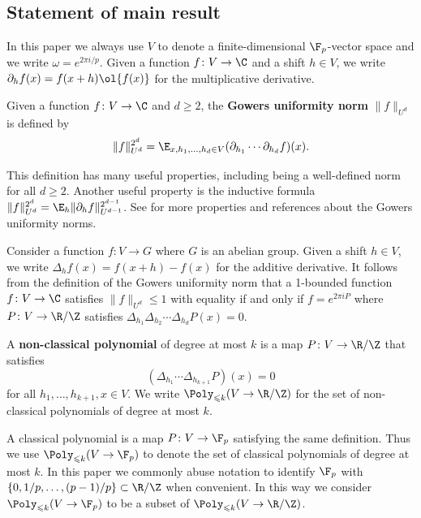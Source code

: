 \subsection{Statement of main result}

In this paper we always use $V$ to denote a finite-dimensional $\F_p$-vector space and we write $\omega=e^{2\pi i/p}$. Given a function $f\colon V\to\C$ and a shift $h\in V$, we write $\partial_h f(x)=f(x+h)\ol{f(x)}$ for the multiplicative derivative.

\begin{defn}
Given a function $f\colon V\to\C$ and $d\geq 2$, the {\textbf{Gowers uniformity norm}} $\|f\|_{U^d}$ is defined by \[\|f\|_{U^d}^{2^d}=\E_{x,h_1,\ldots,h_d\in V}(\partial_{h_1}\cdots\partial_{h_d}f)(x).\]
\end{defn}

This definition has many useful properties, including being a well-defined norm for all $d\geq 2$. Another useful property is the inductive formula $\|f\|_{U^d}^{2^d}=\E_h \|\partial_h f\|_{U^{d-1}}^{2^{d-1}}$.
See \cite[Lemma B.1]{TZ12} for more properties and references about the Gowers uniformity norms.

Consider a function $f\colon V\to G$ where $G$ is an abelian group. Given a shift $h\in V$, we write $\Delta_hf(x)=f(x+h)-f(x)$ for the additive derivative. It follows from the definition of the Gowers uniformity norm that a 1-bounded function $f\colon V\to\C$ satisfies $\|f\|_{U^d}\leq 1$ with equality if and only if $f=e^{2\pi i P}$ where $P\colon V\to\R/\Z$ satisfies $\Delta_{h_1}\Delta_{h_2}\cdots \Delta_{h_d}P(x)=0$. 

\begin{defn}
A \textbf{non-classical polynomial} of degree at most $k$ is a map $P\colon V\to\R/\Z$ that satisfies \[(\Delta_{h_1}\cdots \Delta_{h_{k+1}}P)(x)= 0\] for all $h_1,\ldots,h_{k+1},x\in V$.
We write $\Poly_{\leqslant k}(V\to\R/\Z)$ for the set of non-classical polynomials of degree at most $k$.
\end{defn}

A classical polynomial is a map $P\colon V\to\F_p$ satisfying the same definition. Thus we use $\Poly_{\leqslant k}(V\to\F_p)$ to denote the set of classical polynomials of degree at most $k$. In this paper we commonly abuse notation to identify $\F_p$ with $\{0,1/p,\ldots,(p-1)/p\}\subset\R/\Z$ when convenient. In this way we consider $\Poly_{\leqslant k}(V\to\F_p)$ to be a subset of $\Poly_{\leqslant k}(V\to\R/\Z)$.

